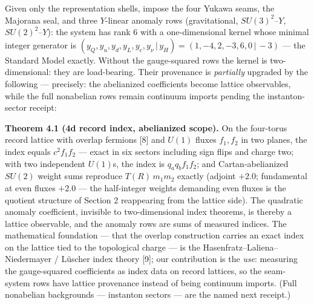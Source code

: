 \documentclass[11pt]{article}
\begin{document}
Given only the representation shells, impose the four Yukawa seams, the Majorana seal, and three $Y$-linear anomaly rows (gravitational, $SU(3)^2$–$Y$, $SU(2)^2$–$Y$): the system has rank 6 with a one-dimensional kernel whose minimal integer generator is $(y_Q, y_u, y_d, y_L, y_e, y_\nu \,|\, y_H) = (1, -4, 2, -3, 6, 0 \,|\, -3)$ — the Standard Model exactly. Without the gauge-squared rows the kernel is two-dimensional: they are load-bearing.  Their provenance is \emph{partially} upgraded by the following — precisely: the abelianized coefficients become lattice observables, while the full nonabelian rows remain continuum imports pending the instanton-sector receipt:

\textbf{Theorem 4.1 (4d record index, abelianized scope).}  On the four-torus record lattice with overlap fermions [8] and $U(1)$ fluxes $f_1, f_2$ in two planes, the index equals $c^2 f_1 f_2$ — exact in six sectors including sign flips and charge two; with two independent $U(1)$s, the index is $q_a q_b f_1 f_2$; and Cartan-abelianized $SU(2)$ weight sums reproduce $T(R)\,m_1 m_2$ exactly (adjoint $+2.0$; fundamental at even fluxes $+2.0$ — the half-integer weights demanding even fluxes is the quotient structure of Section 2 reappearing from the lattice side).  The quadratic anomaly coefficient, invisible to two-dimensional index theorems, is thereby a lattice observable, and the anomaly rows are sums of measured indices.  The mathematical foundation — that the overlap construction carries an exact index on the lattice tied to the topological charge — is the Hasenfratz–Laliena–Niedermayer / Lüscher index theory [9]; our contribution is the \emph{use}: measuring the gauge-squared coefficients as index data on record lattices, so the seam-system rows have lattice provenance instead of being continuum imports.  (Full nonabelian backgrounds — instanton sectors — are the named next receipt.)
\end{document}

